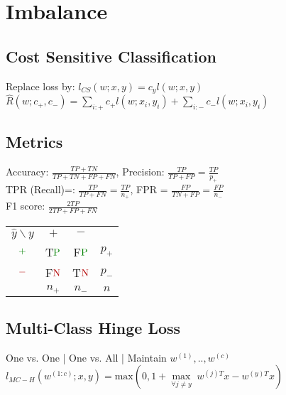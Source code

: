 \section*{\normalsize{Imbalance}}
\subsection*{Cost Sensitive Classification}
Replace loss by: $l_{CS}(w;x,y) = c_y l(w;x,y)$\\
$\hat{R}(w;c_+,c_-)=\sum_{i:+}c_+ l(w;x_i,y_i)+\sum_{i:-}c_- l(w;x_i,y_i)$


\subsection*{Metrics}
Accuracy: $\frac{TP+TN}{TP+TN+FP+FN}$, Precision: $\frac{TP}{TP+FP}=\frac{TP}{p_+}$\\ 
TPR (Recall)=: $\frac{TP}{TP+FN}=\frac{TP}{n_+}$, FPR = $\frac{FP}{TN+FP}=\frac{FP}{n_-}$\\
F1 score: $\frac{2TP}{2TP+FP+FN}$ 
\begin{tabular}{ c c c c }
 $\hat{y} \backslash y$ & $+$ & $-$ &  \\ 
 $\color{ag}+$ & T$\color{ag}\text{P}$ & F$\color{ag}\text{P}$ & $p_+$\\  
 $\color{ar}-$ & F$\color{ar}\text{N}$ & T$\color{ar}\text{N}$ & $p_-$ \\
  & $n_+$ & $n_-$ & $n$
 \end{tabular}

\subsection*{Multi-Class Hinge Loss}
One vs. One | One vs. All | Maintain $w^{(1)},..,w^{(c)}$ \\
$l_{MC-H}(w^{(1:c)};x,y) = \text{max} (0,1+ \underset{\forall j\neq y}{\operatorname{max }}\; w^{(j)T} x - w^{(y)T} x)$
